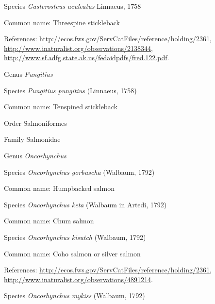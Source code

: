 \documentclass[9pt, article]{memoir}
\begin{document}
\begin{multicols}{2}
\vspace{6pt}\noindent\hspace{36pt}Species \textit{Gasterosteus aculeatus} Linnaeus, 1758


Common name: Threespine stickleback

References: 
\url{http://ecos.fws.gov/ServCatFiles/reference/holding/2361}, 
\url{http://www.inaturalist.org/observations/2138344}, 
\url{http://www.sf.adfg.state.ak.us/fedaidpdfs/fred.122.pdf}.

\vspace{6pt}\noindent\hspace{30pt}Genus \textit{Pungitius}


\vspace{6pt}\noindent\hspace{36pt}Species \textit{Pungitius pungitius} (Linnaeus, 1758)


Common name: Tenspined stickleback

\vspace{6pt}\noindent\hspace{18pt}Order Salmoniformes


\vspace{6pt}\noindent\hspace{24pt}Family Salmonidae


\vspace{6pt}\noindent\hspace{30pt}Genus \textit{Oncorhynchus}


\vspace{6pt}\noindent\hspace{36pt}Species \textit{Oncorhynchus gorbuscha} (Walbaum, 1792)


Common name: Humpbacked salmon

\vspace{6pt}\noindent\hspace{36pt}Species \textit{Oncorhynchus keta} (Walbaum in Artedi, 1792)


Common name: Chum salmon

\vspace{6pt}\noindent\hspace{36pt}Species \textit{Oncorhynchus kisutch} (Walbaum, 1792)


Common name: Coho salmon or silver salmon

References: 
\url{http://ecos.fws.gov/ServCatFiles/reference/holding/2361}, 
\url{http://www.inaturalist.org/observations/4891214}.

\vspace{6pt}\noindent\hspace{36pt}Species \textit{Oncorhynchus mykiss} (Walbaum, 1792)



\end{multicols}
\end{document}

